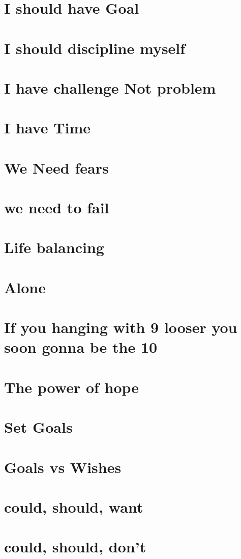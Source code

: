 \documentclass[12pt]{article}
\begin{document}
	\section{I should have Goal}
	\section{I should discipline myself}
	\section{I have challenge Not problem}
	\section{I have Time}
	\section{We Need fears}
	\section{we need to fail}
	\section{Life balancing}
	\section{Alone}
	\section{If you hanging with 9 looser you soon gonna be the 10}
	\section{The power of hope}
	\section{Set Goals}
	\section{Goals vs Wishes}
	\section{could, should, want}
	\section{could, should, don't}
\end{document}
